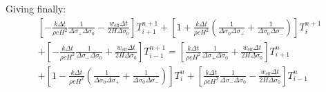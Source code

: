 \documentclass[10pt,english,a4paper]{article}
\begin{document}
%
Giving finally:
%
\begin{multline}
\left[-\frac{k\Delta t}{\rho c H^2}\frac{1}{\Delta\sigma_{+}\Delta\sigma_{0}}-\frac{w_{\mathrm{eff}}\Delta t}{2H\Delta\sigma_0}\right]T^{n+1}_{i+1}
+\left[1+\frac{k\Delta t}{\rho c H^2}\left(\frac{1}{\Delta\sigma_{0}\Delta\sigma_{+}}+\frac{1}{\Delta\sigma_{0}\Delta\sigma_{-}}\right)\right]T^{n+1}_i\\
+\left[-\frac{k\Delta t}{\rho c H^2}\frac{1}{\Delta\sigma_{-}\Delta\sigma_{0}}+\frac{w_{\mathrm{eff}}\Delta t}{2H\Delta\sigma_0}\right]T^{n+1}_{i-1}=
\left[\frac{k\Delta t}{\rho c H^2}\frac{1}{\Delta\sigma_{+}\Delta\sigma_{0}}+\frac{w_{\mathrm{eff}}\Delta t}{2H\Delta\sigma_0}\right]T^{n}_{i+1}\\
+\left[1-\frac{k\Delta t}{\rho c H^2}\left(\frac{1}{\Delta\sigma_{0}\Delta\sigma_{+}}+\frac{1}{\Delta\sigma_{0}\Delta\sigma_{-}}\right)\right]T^{n}_i
+\left[\frac{k\Delta t}{\rho c H^2}\frac{1}{\Delta\sigma_{-}\Delta\sigma_{0}}-\frac{w_{\mathrm{eff}}\Delta t}{2H\Delta\sigma_0}\right]T^{n}_{i-1}
\end{multline}
%
\end{document}
